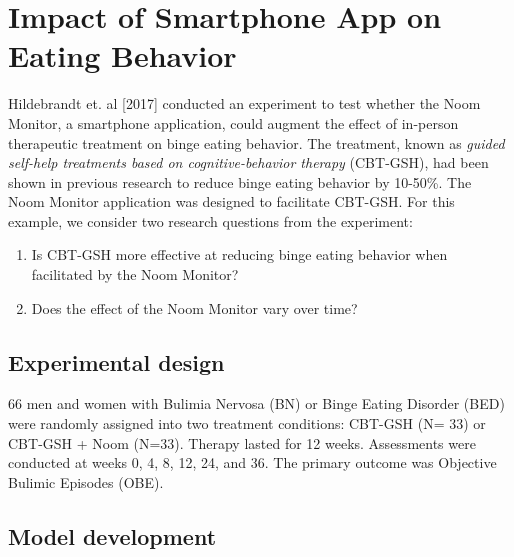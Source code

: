 \documentclass{article}
\begin{document}
\section{Impact of Smartphone App on Eating Behavior}

Hildebrandt et. al [2017] conducted an experiment to test whether the Noom Monitor, a smartphone application, could augment the effect of in-person therapeutic treatment on binge eating behavior.  The treatment, known as \emph{guided self-help treatments based on cognitive-behavior therapy} (CBT-GSH), had been shown in previous research to reduce binge eating behavior by 10-50\%.  The Noom Monitor application was designed to facilitate CBT-GSH.  For this example, we consider two research questions from the experiment:
\begin{enumerate}
\item{Is CBT-GSH more effective at reducing binge eating behavior when facilitated by the Noom Monitor?}
\item{Does the effect of the Noom Monitor vary over time?}
\end{enumerate}

\subsection{Experimental design}

66 men and women with Bulimia Nervosa (BN) or Binge Eating Disorder (BED) were randomly assigned into two treatment conditions: CBT-GSH (N= 33) or CBT-GSH + Noom (N=33).  Therapy lasted for 12 weeks.  Assessments were conducted at weeks 0, 4, 8, 12, 24, and 36.  The primary outcome was Objective Bulimic Episodes (OBE).  

\subsection{Model development}
\end{document}
